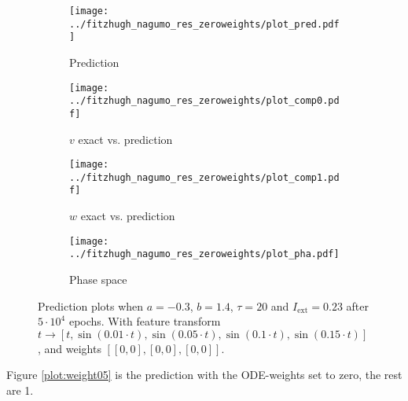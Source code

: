 \documentclass[a4paper]{article}
\begin{document}
\begin{figure}[H]
	\centering 
	\begin{subfigure}[b]{0.47\textwidth}
		\centering
		\texttt{[image: ../fitzhugh\_nagumo\_res\_zeroweights/plot\_pred.pdf]}
		\caption{Prediction}
		\label{fig:weight04a}
	\end{subfigure}
	\begin{subfigure}[b]{0.47\textwidth}
		\centering
		\texttt{[image: ../fitzhugh\_nagumo\_res\_zeroweights/plot\_comp0.pdf]}
		\caption{$v$ exact vs. prediction}
		\label{fig:weight04b}
	\end{subfigure}
	\begin{subfigure}[b]{0.47\textwidth}
		\centering
		\texttt{[image: ../fitzhugh\_nagumo\_res\_zeroweights/plot\_comp1.pdf]}
		\caption{$w$ exact vs. prediction}
		\label{fig:weight04c}
	\end{subfigure}
	\begin{subfigure}[b]{0.47\textwidth}
		\centering
		\texttt{[image: ../fitzhugh\_nagumo\_res\_zeroweights/plot\_pha.pdf]}
		\caption{Phase space}
		\label{fig:weight04d}
	\end{subfigure}
	\caption{Prediction plots when $a=-0.3$, $b=1.4$, $\tau=20$ and $ I_{\text{ext}}=0.23$ after $5\cdot10^4$ epochs. With feature transform $t \rightarrow \left[ t, \sin(0.01 \cdot  t), \sin(0.05 \cdot  t), \sin(0.1 \cdot  t), \sin(0.15 \cdot  t)\right] $, and weights $\left[ \left[ 0, 0\right], \left[ 0, 0\right], \left[ 0, 0\right]\right]$.}
	\label{plot:weight04}
\end{figure}


Figure \ref{plot:weight05} is the prediction with the ODE-weights set to zero, the rest are 1.
\end{document}
